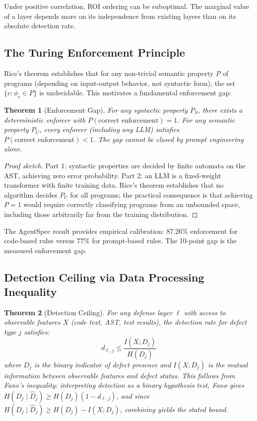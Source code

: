 \documentclass[11pt, a4paper, logo, copyright]{googledeepmind}
\newtheorem{theorem}{Theorem}[section]
\begin{document}
Under positive correlation, ROI ordering can be suboptimal. The marginal value of a layer depends more on its independence from existing layers than on its absolute detection rate.

\subsection{The Turing Enforcement Principle}

Rice's theorem establishes that for any non-trivial semantic property $P$ of programs (depending on input-output behavior, not syntactic form), the set $\{e : \phi_e \in P\}$ is undecidable. This motivates a fundamental enforcement gap:

\begin{theorem}[Enforcement Gap]
\label{thm:enforcement-gap}
For any syntactic property $P_S$, there exists a deterministic enforcer with $P(\text{correct enforcement}) = 1$. For any semantic property $P_U$, every enforcer (including any LLM) satisfies $P(\text{correct enforcement}) < 1$. The gap cannot be closed by prompt engineering alone.
\end{theorem}

\begin{proof}[Proof sketch]
Part 1: syntactic properties are decided by finite automata on the AST, achieving zero error probability. Part 2: an LLM is a fixed-weight transformer with finite training data. Rice's theorem establishes that no algorithm decides $P_U$ for all programs; the practical consequence is that achieving $P = 1$ would require correctly classifying programs from an unbounded space, including those arbitrarily far from the training distribution.
\end{proof}

The AgentSpec result \citep{wang2026agentspec} provides empirical calibration: 87.26\% enforcement for code-based rules versus 77\% for prompt-based rules. The 10-point gap is the measured enforcement gap.

\subsection{Detection Ceiling via Data Processing Inequality}

\begin{theorem}[Detection Ceiling]
\label{thm:detection-ceiling}
For any defense layer $\ell$ with access to observable features $X$ (code text, AST, test results), the detection rate for defect type $j$ satisfies:
\begin{equation}
    d_{\ell,j} \leq \frac{I(X; D_j)}{H(D_j)}
\end{equation}
where $D_j$ is the binary indicator of defect presence and $I(X; D_j)$ is the mutual information between observable features and defect status. This follows from Fano's inequality: interpreting detection as a binary hypothesis test, Fano gives $H(D_j \mid \hat{D}_j) \geq H(D_j)(1 - d_{\ell,j})$, and since $H(D_j \mid \hat{D}_j) \geq H(D_j) - I(X; D_j)$, combining yields the stated bound.
\end{theorem}
\end{document}
